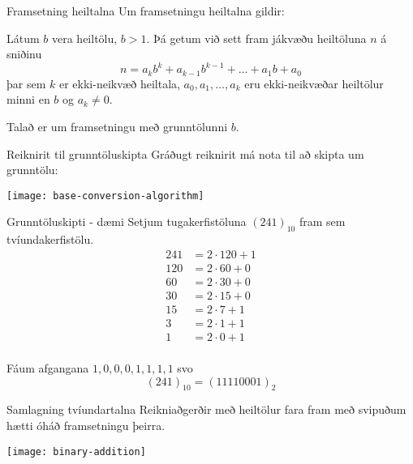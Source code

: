 \documentclass{beamer}
\begin{document}
\begin{frame}{Framsetning heiltalna}
Um framsetningu heiltalna gildir:

\begin{tcolorbox}[title=Framsetning heiltalna]
Látum $b$ vera heiltölu, $b > 1$. Þá getum við sett fram jákvæðu heiltöluna $n$ á sniðinu
\[
 n = a_kb^k + a_{k-1}b^{k-1} + \ldots + a_1b + a_0
\]
þar sem $k$ er ekki-neikvæð heiltala, $a_0, a_1, \ldots, a_k$ eru ekki-neikvæðar heiltölur minni en $b$ og $a_k \neq 0$.
\end{tcolorbox}
Talað er um framsetningu með grunntölunni $b$.
\end{frame}

\begin{frame}{Reiknirit til grunntöluskipta}
Gráðugt reiknirit má nota til að skipta um grunntölu:
\begin{center}
\texttt{[image: base-conversion-algorithm]}
\end{center}
\end{frame}

\begin{frame}{Grunntöluskipti - dæmi}
\vspace{0.5cm}
Setjum tugakerfistöluna $(241)_{10}$ fram sem tvíundakerfistölu.
\begin{align*}
241 &= 2 \cdot 120 + 1\\
120 &= 2 \cdot 60 + 0\\
60 &= 2 \cdot 30 + 0\\
30 &= 2 \cdot 15 + 0\\
15 &= 2 \cdot 7 + 1\\
3 &= 2 \cdot 1 + 1\\
1&= 2 \cdot 0 + 1\\
\end{align*}

\vspace{-0.8cm}
Fáum afgangana $1, 0, 0, 0, 1, 1, 1, 1$ svo
\[
 (241)_{10} = (11110001)_2
\]
\end{frame}

\begin{frame}{Samlagning tvíundartalna}
Reikniaðgerðir með heiltölur fara fram með svipuðum hætti óháð framsetningu þeirra.
\begin{center}
\texttt{[image: binary-addition]}
\end{center}
\end{frame}
\end{document}
